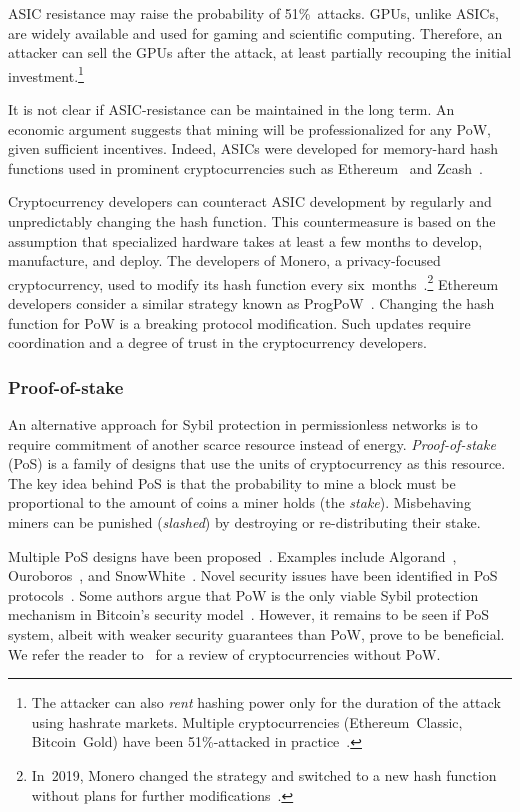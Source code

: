 ASIC resistance may raise the probability of 51\%~attacks.
GPUs, unlike ASICs, are widely available and used for gaming and scientific computing.
Therefore, an attacker can sell the GPUs after the attack, at least partially recouping the initial investment.\footnote{The attacker can also \textit{rent} hashing power only for the duration of the attack using hashrate markets. Multiple cryptocurrencies (Ethereum~Classic, Bitcoin~Gold) have been 51\%-attacked in practice~\cite{Xazax3102019}.}

It is not clear if ASIC-resistance can be maintained in the long term.
An economic argument suggests that mining will be professionalized for any PoW, given sufficient incentives.
Indeed, ASICs were developed for memory-hard hash functions used in prominent cryptocurrencies such as Ethereum~\cite{OLeary2018} and Zcash~\cite{Floyd2018}.

Cryptocurrency developers can counteract ASIC development by regularly and unpredictably changing the hash function.
This countermeasure is based on the assumption that specialized hardware takes at least a few months to develop, manufacture, and deploy.
The developers of Monero, a privacy-focused cryptocurrency, used to modify its hash function every six~months~\cite{Kim2019}.\footnote{In~2019, Monero changed the strategy and switched to a new hash function without plans for further modifications~\cite{dEBRUYNE2019}.}
Ethereum developers consider a similar strategy known as ProgPoW~\cite{OLeary2019}.
Changing the hash function for PoW is a breaking protocol modification.
Such updates require coordination and a degree of trust in the cryptocurrency developers.


\subsubsection*{Proof-of-stake}

An alternative approach for Sybil protection in permissionless networks is to require commitment of another scarce resource instead of energy.
\textit{Proof-of-stake} (PoS) is a family of designs that use the units of cryptocurrency as this resource.
The key idea behind PoS is that the probability to mine a block must be proportional to the amount of coins a miner holds (the \textit{stake}).
Misbehaving miners can be punished (\textit{slashed}) by destroying or re-distributing their stake.


Multiple PoS designs have been proposed~\cite{Bano2019}.
Examples include Algorand~\cite{Chen2019}, Ouroboros~\cite{Kiayias2017}, and SnowWhite~\cite{Bentov2016a}.
Novel security issues have been identified in PoS protocols~\cite{Fanti2019,Gazi2018,BrownCohen2019,Chitra2020}.
Some authors argue that PoW is the only viable Sybil protection mechanism in Bitcoin's security model~\cite{Andreev2014, Sztorc2015, Poelstra2015}.
However, it remains to be seen if PoS system, albeit with weaker security guarantees than PoW, prove to be beneficial.
We refer the reader to~\cite{Bentov2016} for a review of cryptocurrencies without PoW.



